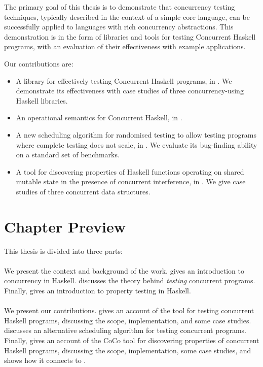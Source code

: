 The primary goal of this thesis is to demonstrate that concurrency
testing techniques, typically described in the context of a simple
core language, can be successfully applied to languages with rich
concurrency abstractions.  This demonstration is in the form of
libraries and tools for testing Concurrent Haskell programs, with an
evaluation of their effectiveness with example applications.

Our contributions are:

\begin{itemize}
\item A library for effectively testing Concurrent Haskell programs,
  in .  We demonstrate its effectiveness with case
  studies of three concurrency-using Haskell libraries.
\item An operational semantics for Concurrent Haskell, in
  .
\item A new scheduling algorithm for randomised testing to allow
  testing programs where complete testing does not scale, in
  .  We evaluate its bug-finding ability on a
  standard set of benchmarks.
\item A tool for discovering properties of Haskell functions operating
  on shared mutable state in the presence of concurrent interference,
  in .  We give case studies of three concurrent data
  structures.
\end{itemize}

\section{Chapter Preview}
\label{sec:intro-roadmap}

This thesis is divided into three parts:

\paragraph{}
We present the context and background of the work.
 gives an introduction to concurrency in
Haskell.   discusses the theory behind \emph{testing}
concurrent programs.  Finally,  gives an
introduction to property testing in Haskell.

\paragraph{}
We present our contributions.   gives an account of
the \dejafu{} tool for testing concurrent Haskell programs, discussing
the scope, implementation, and some case studies.
 discusses an alternative scheduling algorithm
for testing concurrent programs.  Finally,  gives an
account of the CoCo tool for discovering properties of concurrent
Haskell programs, discussing the scope, implementation, some case
studies, and shows how it connects to \dejafu{}.

